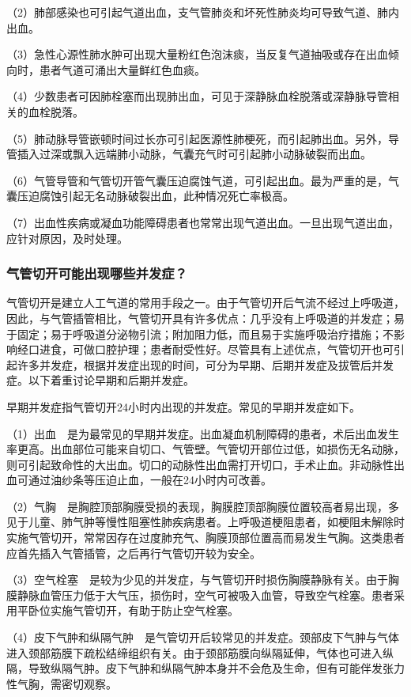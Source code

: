 （2）肺部感染也可引起气道出血，支气管肺炎和坏死性肺炎均可导致气道、肺内出血。

（3）急性心源性肺水肿可出现大量粉红色泡沫痰，当反复气道抽吸或存在出血倾向时，患者气道可涌出大量鲜红色血痰。

（4）少数患者可因肺栓塞而出现肺出血，可见于深静脉血栓脱落或深静脉导管相关的血栓脱落。

（5）肺动脉导管嵌顿时间过长亦可引起医源性肺梗死，而引起肺出血。另外，导管插入过深或飘入远端肺小动脉，气囊充气时可引起肺小动脉破裂而出血。

（6）气管导管和气管切开管气囊压迫腐蚀气道，可引起出血。最为严重的是，气囊压迫腐蚀引起无名动脉破裂出血，此种情况死亡率极高。

（7）出血性疾病或凝血功能障碍患者也常常出现气道出血。一旦出现气道出血，应针对原因，及时处理。

\subsubsection{气管切开可能出现哪些并发症？}

气管切开是建立人工气道的常用手段之一。由于气管切开后气流不经过上呼吸道，因此，与气管插管相比，气管切开具有许多优点：几乎没有上呼吸道的并发症；易于固定；易于呼吸道分泌物引流；附加阻力低，而且易于实施呼吸治疗措施；不影响经口进食，可做口腔护理；患者耐受性好。尽管具有上述优点，气管切开也可引起许多并发症，根据并发症出现的时间，可分为早期、后期并发症及拔管后并发症。以下着重讨论早期和后期并发症。

早期并发症指气管切开24小时内出现的并发症。常见的早期并发症如下。

（1）出血　是为最常见的早期并发症。出血凝血机制障碍的患者，术后出血发生率更高。出血部位可能来自切口、气管壁。气管切开部位过低，如损伤无名动脉，则可引起致命性的大出血。切口的动脉性出血需打开切口，手术止血。非动脉性出血可通过油纱条等压迫止血，一般在24小时内可改善。

（2）气胸　是胸腔顶部胸膜受损的表现，胸膜腔顶部胸膜位置较高者易出现，多见于儿童、肺气肿等慢性阻塞性肺疾病患者。上呼吸道梗阻患者，如梗阻未解除时实施气管切开，常常因存在过度肺充气、胸膜顶部位置高而易发生气胸。这类患者应首先插入气管插管，之后再行气管切开较为安全。

（3）空气栓塞　是较为少见的并发症，与气管切开时损伤胸膜静脉有关。由于胸膜静脉血管压力低于大气压，损伤时，空气可被吸入血管，导致空气栓塞。患者采用平卧位实施气管切开，有助于防止空气栓塞。

（4）皮下气肿和纵隔气肿　是气管切开后较常见的并发症。颈部皮下气肿与气体进入颈部筋膜下疏松结缔组织有关。由于颈部筋膜向纵隔延伸，气体也可进入纵隔，导致纵隔气肿。皮下气肿和纵隔气肿本身并不会危及生命，但有可能伴发张力性气胸，需密切观察。

